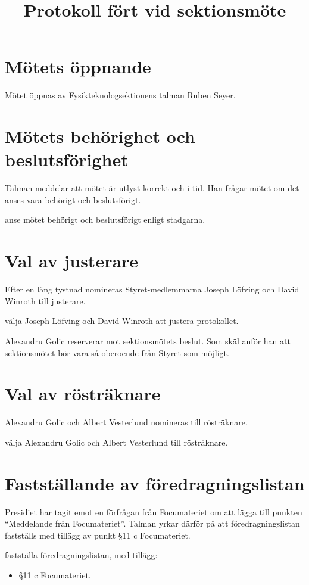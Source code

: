\documentclass[hidelinks]{sektionsmote}
\title{Protokoll fört vid sektionsmöte}
\begin{document}
\maketitle

\section{Mötets öppnande}
Mötet öppnas \tid av Fysikteknologsektionens talman Ruben Seyer.


\section{Mötets behörighet och beslutsförighet}
Talman meddelar att mötet är utlyst korrekt och i tid.
Han frågar mötet om det anses vara behörigt och beslutsförigt.
\begin{beslut}
    \item anse mötet behörigt och beslutsförigt enligt stadgarna.
\end{beslut}


\section{Val av justerare}
Efter en lång tystnad nomineras Styret-medlemmarna Joseph Löfving och David Winroth till justerare.
\begin{beslut}
    \item välja Joseph Löfving och David Winroth att justera protokollet. 
\end{beslut}
Alexandru Golic reserverar mot sektionsmötets beslut.
Som skäl anför han att sektionsmötet bör vara så oberoende från Styret som möjligt.


\section{Val av rösträknare}
Alexandru Golic och Albert Vesterlund nomineras till rösträknare.
\begin{beslut}
    \item välja Alexandru Golic och Albert Vesterlund till rösträknare.
\end{beslut}


\section{Fastställande av föredragningslistan}
Presidiet har tagit emot en förfrågan från Focumateriet om att lägga till punkten \enquote{Meddelande från Focumateriet}.
Talman yrkar därför på att föredragningslistan fastställs med tillägg av punkt §11 c Focumateriet.
\begin{beslut}
    \item fastställa föredragningslistan, med tillägg: 
    \begin{itemize}
        \item §11 c Focumateriet.
    \end{itemize}
\end{beslut}
\end{document}
